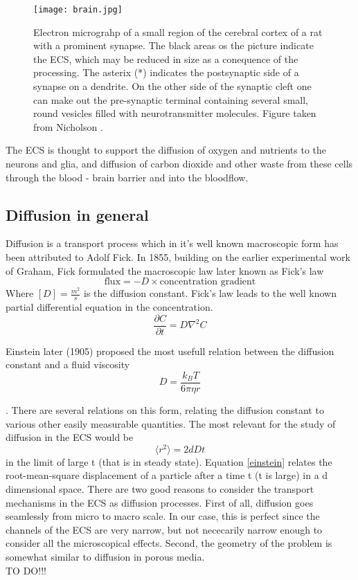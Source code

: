 \documentclass[a4paper,english, 12pt, twoside]{article}
\renewcommand{\d}{\partial}
\begin{document}
\begin{figure}[H]
 \centering
 \texttt{[image: brain.jpg]}
 \caption{Electron micrograhp of a small region of the cerebral cortex of a rat with a prominent synapse. 
 The black areas os the picture indicate the ECS, which may be reduced in size as a conequence of the processing. 
 The asterix (*) indicates the postsynaptic side of a synapse on a dendrite. 
 On the other side of the synaptic cleft one can make out the pre-synaptic terminal containing several small, round vesicles filled with neurotransmitter molecules. 
 Figure taken from Nicholson \cite{nicholson2001diffusion}.}
 \label{ECS}
\end{figure}

The ECS is thought to support the diffusion of oxygen and nutrients to the neurons and glia, and diffusion of carbon dioxide and other waste from these cells through the blood - brain barrier and into the bloodflow. 

\subsection{Diffusion in general}
Diffusion is a transport process which in it's well known macroscopic form has been attributed to Adolf Fick. 
In 1855, building on the earlier experimental work of Graham, Fick formulated the macroscopic law later known as Fick's law
\begin{equation}
 \text{flux} = -D\times\text{concentration gradient}
\end{equation}
Where $[D] = \frac{m^2}{s}$ is the diffusion constant. Fick's law leads to the well known partial differential equation in the concentration.
\begin{equation}\label{diffusion_eq}
 \frac{\d C}{\d t} = D\nabla^2C
\end{equation}

Einstein later (1905) proposed the most usefull relation between the diffusion constant and a fluid viscosity 
\begin{equation}\label{einstein_viscosity}
D = \frac{k_B T}{6\pi \eta r}
\end{equation}

.
There are several relations on this form, relating the diffusion constant to various other easily measurable quantities. 
The most relevant for the study of diffusion in the ECS would be
\begin{equation}\label{einstein}
 \langle r^2\rangle = 2dDt
\end{equation}
in the limit of large t (that is in steady state). Equation \ref{einstein} relates the root-mean-square displacement of a particle after a time t (t is large) in a d dimensional space. 
There are two good reasons to consider the transport mechanisms in the ECS as diffusion processes. 
First of all, diffusion goes seamlessly from micro to macro scale. In our case, this is perfect since the channels of the ECS are very narrow, but not nececarily narrow enough to consider all the microscopical effects. Second, the geometry of the problem is somewhat similar to diffusion in porous media.\\
TO DO!!!
\end{document}
